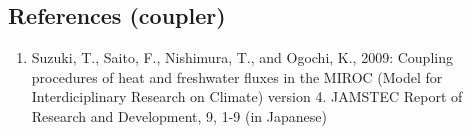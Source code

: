 \hypertarget{references-coupler}{%
  \subsection{References (coupler)}\label{references-coupler}}

\begin{enumerate}
  \def\labelenumi{\arabic{enumi}.}
\item
  Suzuki, T., Saito, F., Nishimura, T., and Ogochi, K., 2009: Coupling
  procedures of heat and freshwater fluxes in the MIROC (Model for
  Interdiciplinary Research on Climate) version 4. JAMSTEC Report of
  Research and Development, 9, 1-9 (in Japanese)
  \end{enumerate}
